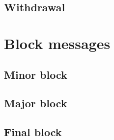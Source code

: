 \documentclass[../hydrozoa.tex]{subfiles}
\begin{document}

\subsection{Withdrawal}%
\label{h:consensus-withdrawal}


\section{Block messages}%
\label{h:consensus-blocks}

\subsection{Minor block}%
\label{h:consensus-minor-block}



\subsection{Major block}%
\label{h:consensus-major-block}



\subsection{Final block}%
\label{h:consensus-final-block}


\end{document}
